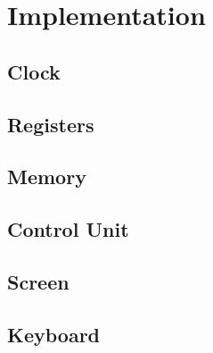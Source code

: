\section{Implementation}

\subsection{Clock}
\subsection{Registers}
\subsection{Memory}
\subsection{Control Unit}
\subsection{Screen}
\subsection{Keyboard}
